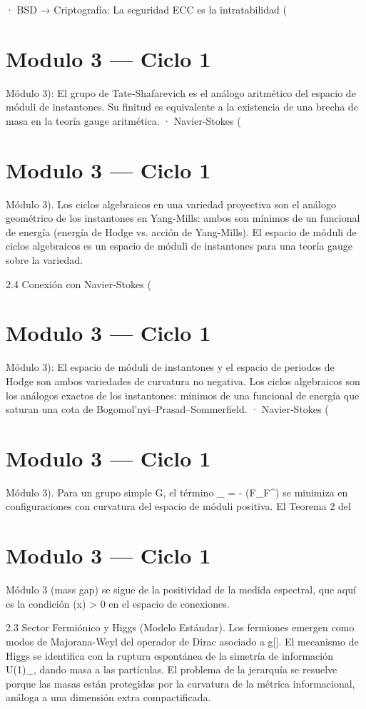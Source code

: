 \documentclass[12pt,twoside]{book}
\begin{document}
· BSD → Criptografía: La seguridad ECC es la intratabilidad (

\chapter{Modulo 3 — Ciclo 1}
Módulo 3): El grupo de Tate‑Shafarevich es el análogo aritmético del espacio de móduli de instantones. Su finitud es equivalente a la existencia de una brecha de masa en la teoría gauge aritmética.
· Navier‑Stokes (

\chapter{Modulo 3 — Ciclo 1}
Módulo 3).
Los ciclos algebraicos en una variedad proyectiva son el análogo geométrico de los instantones en Yang-Mills: ambos son mínimos de un funcional de energía (energía de Hodge vs. acción de Yang-Mills). El espacio de móduli de ciclos algebraicos es un espacio de móduli de instantones para una teoría gauge sobre la variedad.

2.4 Conexión con Navier-Stokes (

\chapter{Modulo 3 — Ciclo 1}
Módulo 3): El espacio de móduli de instantones y el espacio de periodos de Hodge son ambos variedades de curvatura no negativa. Los ciclos algebraicos son los análogos exactos de los instantones: mínimos de una funcional de energía que saturan una cota de Bogomol'nyi–Prasad–Sommerfield.
· Navier‑Stokes (

\chapter{Modulo 3 — Ciclo 1}
Módulo 3).
Para un grupo simple G, el término _{} = - (F_{\mu\nu}F^{\mu\nu}) se minimiza en configuraciones con curvatura del espacio de móduli positiva. El Teorema 2 del 

\chapter{Modulo 3 — Ciclo 1}
Módulo 3 (mass gap) se sigue de la positividad de la medida espectral, que aquí es la condición \rho(x) > 0 en el espacio de conexiones.

2.3 Sector Fermiónico y Higgs (Modelo Estándar).
Los fermiones emergen como modos de Majorana-Weyl del operador de Dirac asociado a g[\rho]. El mecanismo de Higgs se identifica con la ruptura espontánea de la simetría de información U(1)_{}, dando masa a las partículas. El problema de la jerarquía se resuelve porque las masas están protegidas por la curvatura de la métrica informacional, análoga a una dimensión extra compactificada.
\end{document}
